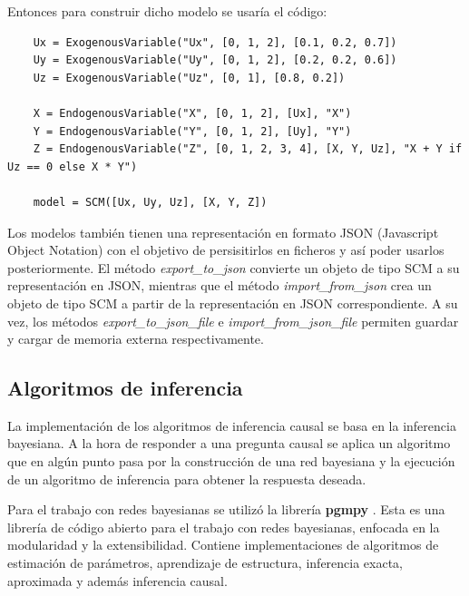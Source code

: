 Entonces para construir dicho modelo se usaría el código:

\begin{lstlisting}
	Ux = ExogenousVariable("Ux", [0, 1, 2], [0.1, 0.2, 0.7])
	Uy = ExogenousVariable("Uy", [0, 1, 2], [0.2, 0.2, 0.6])
	Uz = ExogenousVariable("Uz", [0, 1], [0.8, 0.2])
	
	X = EndogenousVariable("X", [0, 1, 2], [Ux], "X")
	Y = EndogenousVariable("Y", [0, 1, 2], [Uy], "Y")
	Z = EndogenousVariable("Z", [0, 1, 2, 3, 4], [X, Y, Uz], "X + Y if Uz == 0 else X * Y")
	
	model = SCM([Ux, Uy, Uz], [X, Y, Z])
\end{lstlisting}

Los modelos también tienen una representación en formato JSON (Javascript Object Notation) con el objetivo de persisitirlos en ficheros y así poder usarlos posteriormente. El método \textit{export\_to\_json} convierte un objeto de tipo SCM a su representación en JSON, mientras que el método \textit{import\_from\_json} crea un objeto de tipo SCM a partir de la representación en JSON correspondiente. A su vez, los métodos \textit{export\_to\_json\_file} e \textit{import\_from\_json\_file} permiten guardar y cargar de memoria externa respectivamente.

\subsection{Algoritmos de inferencia}
La implementación de los algoritmos de inferencia causal se basa en la inferencia bayesiana. A la hora de responder a una pregunta causal se aplica un algoritmo que en algún punto pasa por la construcción de una red bayesiana y la ejecución de un algoritmo de inferencia para obtener la respuesta deseada.

Para el trabajo con redes bayesianas se utilizó la librería \textbf{pgmpy} \cite{ankan2015pgmpy}. Esta es una librería de código abierto para el trabajo con redes bayesianas, enfocada en la modularidad y la extensibilidad. Contiene implementaciones de algoritmos de estimación de parámetros, aprendizaje de estructura, inferencia exacta, aproximada y además inferencia causal.


